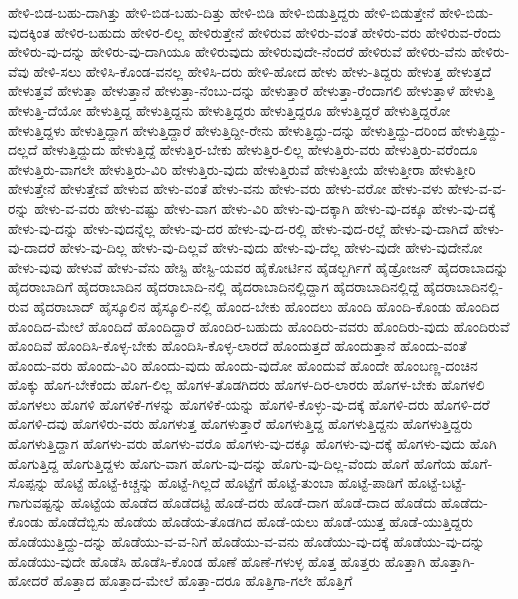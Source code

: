 {ಹೇಳಿ-ಬಿಡ-ಬಹು-ದಾಗಿತ್ತು
ಹೇಳಿ-ಬಿಡ-ಬಹು-ದಿತ್ತು
ಹೇಳಿ-ಬಿಡಿ
ಹೇಳಿ-ಬಿಡುತ್ತಿದ್ದರು
ಹೇಳಿ-ಬಿಡುತ್ತೇನೆ
ಹೇಳಿ-ಬಿಡು-ವುದಕ್ಕಿಂತ
ಹೇಳಿರ-ಬಹುದು
ಹೇಳಿರ-ಲಿಲ್ಲ
ಹೇಳಿರುತ್ತೇನೆ
ಹೇಳಿರುವ
ಹೇಳಿರು-ವಂತೆ
ಹೇಳಿರು-ವರು
ಹೇಳಿರುವ-ರೆಂದು
ಹೇಳಿರು-ವು-ದನ್ನು
ಹೇಳಿರು-ವು-ದಾಗಿಯೂ
ಹೇಳಿರುವುದು
ಹೇಳಿರುವುದೇ-ನೆಂದರೆ
ಹೇಳಿರುವೆ
ಹೇಳಿರು-ವೆನು
ಹೇಳಿರು-ವೆವು
ಹೇಳಿ-ಸಲು
ಹೇಳಿಸಿ-ಕೊಂಡ-ವನಲ್ಲ
ಹೇಳಿಸಿ-ದರು
ಹೇಳಿ-ಹೋದ
ಹೇಳು
ಹೇಳು-ತಿದ್ದರು
ಹೇಳುತ್ತ
ಹೇಳುತ್ತದೆ
ಹೇಳುತ್ತವೆ
ಹೇಳುತ್ತಾ
ಹೇಳುತ್ತಾನೆ
ಹೇಳುತ್ತಾ-ನೆಂಬು-ದನ್ನು
ಹೇಳುತ್ತಾರೆ
ಹೇಳುತ್ತಾ-ರೆಂದಾಗಲಿ
ಹೇಳುತ್ತಾಳೆ
ಹೇಳುತ್ತಿ
ಹೇಳುತ್ತಿ-ದೆಯೋ
ಹೇಳುತ್ತಿದ್ದ
ಹೇಳುತ್ತಿದ್ದನು
ಹೇಳುತ್ತಿದ್ದರು
ಹೇಳುತ್ತಿದ್ದರೂ
ಹೇಳುತ್ತಿದ್ದರೆ
ಹೇಳುತ್ತಿದ್ದರೋ
ಹೇಳುತ್ತಿದ್ದಳು
ಹೇಳುತ್ತಿದ್ದಾಗ
ಹೇಳುತ್ತಿದ್ದಾರೆ
ಹೇಳುತ್ತಿದ್ದೀ-ರೇನು
ಹೇಳುತ್ತಿದ್ದು-ದನ್ನು
ಹೇಳುತ್ತಿದ್ದು-ದರಿಂದ
ಹೇಳುತ್ತಿದ್ದು-ದಲ್ಲದೆ
ಹೇಳುತ್ತಿದ್ದುದು
ಹೇಳುತ್ತಿದ್ದೆ
ಹೇಳುತ್ತಿರ-ಬೇಕು
ಹೇಳುತ್ತಿರ-ಲಿಲ್ಲ
ಹೇಳುತ್ತಿರು-ವರು
ಹೇಳುತ್ತಿರು-ವರೆಂದೂ
ಹೇಳುತ್ತಿರು-ವಾಗಲೇ
ಹೇಳುತ್ತಿರು-ವಿರಿ
ಹೇಳುತ್ತಿರು-ವುದು
ಹೇಳುತ್ತಿರುವೆ
ಹೇಳುತ್ತೀಯೆ
ಹೇಳುತ್ತೀರಾ
ಹೇಳುತ್ತೀರಿ
ಹೇಳುತ್ತೇನೆ
ಹೇಳುತ್ತೇವೆ
ಹೇಳುವ
ಹೇಳು-ವಂತೆ
ಹೇಳು-ವನು
ಹೇಳು-ವರು
ಹೇಳು-ವರೋ
ಹೇಳು-ವಳು
ಹೇಳು-ವ-ವ-ರನ್ನು
ಹೇಳು-ವ-ವರು
ಹೇಳು-ವಷ್ಟು
ಹೇಳು-ವಾಗ
ಹೇಳು-ವಿರಿ
ಹೇಳು-ವು-ದಕ್ಕಾಗಿ
ಹೇಳು-ವು-ದಕ್ಕೂ
ಹೇಳು-ವು-ದಕ್ಕೆ
ಹೇಳು-ವು-ದನ್ನು
ಹೇಳು-ವುದನ್ನೆಲ್ಲ
ಹೇಳು-ವು-ದರ
ಹೇಳು-ವು-ದ-ರಲ್ಲಿ
ಹೇಳು-ವುದ-ರಲ್ಲೆ
ಹೇಳು-ವು-ದಾಗಿದೆ
ಹೇಳು-ವು-ದಾದರೆ
ಹೇಳು-ವು-ದಿಲ್ಲ
ಹೇಳು-ವು-ದಿಲ್ಲವೆ
ಹೇಳು-ವುದು
ಹೇಳು-ವು-ದೆಲ್ಲ
ಹೇಳು-ವುದೇ
ಹೇಳು-ವುದೇನೋ
ಹೇಳು-ವುವು
ಹೇಳುವೆ
ಹೇಳು-ವೆನು
ಹೇಸ್ಟಿ
ಹೇಸ್ಟಿ-ಯವರ
ಹೈಕೋರ್ಟಿನ
ಹೈಡಲ್ಬರ್ಗಿಗೆ
ಹೈಡ್ರೋಜನ್
ಹೈದರಾಬಾದನ್ನು
ಹೈದರಾಬಾದಿಗೆ
ಹೈದರಾಬಾದಿನ
ಹೈದರಾಬಾದಿ-ನಲ್ಲಿ
ಹೈದರಾಬಾದಿನಲ್ಲಿದ್ದಾಗ
ಹೈದರಾಬಾದಿನಲ್ಲಿದ್ದೆ
ಹೈದರಾಬಾದಿನಲ್ಲಿ-ರುವ
ಹೈದರಾಬಾದ್
ಹೈಸ್ಕೂಲಿನ
ಹೈಸ್ಕೂಲಿ-ನಲ್ಲಿ
ಹೊಂದ-ಬೇಕು
ಹೊಂದಲು
ಹೊಂದಿ
ಹೊಂದಿ-ಕೊಂಡು
ಹೊಂದಿದ
ಹೊಂದಿದ-ಮೇಲೆ
ಹೊಂದಿದೆ
ಹೊಂದಿದ್ದಾರೆ
ಹೊಂದಿರ-ಬಹುದು
ಹೊಂದಿರು-ವವರು
ಹೊಂದಿರು-ವುದು
ಹೊಂದಿರುವೆ
ಹೊಂದಿವೆ
ಹೊಂದಿಸಿ-ಕೊಳ್ಳ-ಬೇಕು
ಹೊಂದಿಸಿ-ಕೊಳ್ಳ-ಲಾರದೆ
ಹೊಂದುತ್ತದೆ
ಹೊಂದುತ್ತಾನೆ
ಹೊಂದು-ವಂತೆ
ಹೊಂದು-ವರು
ಹೊಂದು-ವಿರಿ
ಹೊಂದು-ವುದು
ಹೊಂದು-ವುದೋ
ಹೊಂದುವೆ
ಹೊಂದೇ
ಹೊಂಬಣ್ಣ-ದಂಚಿನ
ಹೊಕ್ಕು
ಹೊಗ-ಬೇಕೆಂದು
ಹೊಗ-ಲಿಲ್ಲ
ಹೊಗಳ-ತೊಡಗಿದರು
ಹೊಗಳ-ದಿರ-ಲಾರರು
ಹೊಗಳ-ಬೇಕು
ಹೊಗಳಲಿ
ಹೊಗಳಲು
ಹೊಗಳಿ
ಹೊಗಳಿಕೆ-ಗಳನ್ನು
ಹೊಗಳಿಕೆ-ಯನ್ನು
ಹೊಗಳಿ-ಕೊಳ್ಳು-ವು-ದಕ್ಕೆ
ಹೊಗಳಿ-ದರು
ಹೊಗಳಿ-ದರೆ
ಹೊಗಳಿ-ದವು
ಹೊಗಳಿರು-ವರು
ಹೊಗಳುತ್ತ
ಹೊಗಳುತ್ತಾರೆ
ಹೊಗಳುತ್ತಿದ್ದ
ಹೊಗಳುತ್ತಿದ್ದನು
ಹೊಗಳುತ್ತಿದ್ದರು
ಹೊಗಳುತ್ತಿದ್ದಾಗ
ಹೊಗಳು-ವರು
ಹೊಗಳು-ವರೊ
ಹೊಗಳು-ವು-ದಕ್ಕೂ
ಹೊಗಳು-ವು-ದಕ್ಕೆ
ಹೊಗಳು-ವುದು
ಹೊಗಿ
ಹೊಗುತ್ತಿದ್ದ
ಹೊಗುತ್ತಿದ್ದಳು
ಹೊಗು-ವಾಗ
ಹೊಗು-ವು-ದನ್ನು
ಹೊಗು-ವು-ದಿಲ್ಲ-ವೆಂದು
ಹೊಗೆ
ಹೊಗೆಯ
ಹೊಗೆ-ಸೊಪ್ಪನ್ನು
ಹೊಟ್ಟೆ
ಹೊಟ್ಟೆ-ಕಿಚ್ಚನ್ನು
ಹೊಟ್ಟೆ-ಗಿಲ್ಲದೆ
ಹೊಟ್ಟೆಗೆ
ಹೊಟ್ಟೆ-ತುಂಬಾ
ಹೊಟ್ಟೆ-ಪಾಡಿಗೆ
ಹೊಟ್ಟೆ-ಬಟ್ಟೆ-ಗಾಗುವಷ್ಟನ್ನು
ಹೊಟ್ಟೆಯ
ಹೊಡೆದ
ಹೊಡೆದಟ್ಟಿ
ಹೊಡೆ-ದರು
ಹೊಡೆ-ದಾಗ
ಹೊಡೆ-ದಾದ
ಹೊಡೆದು
ಹೊಡೆದು-ಕೊಂಡು
ಹೊಡೆದೆಬ್ಬಿಸು
ಹೊಡೆಯ
ಹೊಡೆಯ-ತೊಡಗಿದ
ಹೊಡೆ-ಯಲು
ಹೊಡೆ-ಯುತ್ತ
ಹೊಡೆ-ಯುತ್ತಿದ್ದರು
ಹೊಡೆಯುತ್ತಿದ್ದು-ದನ್ನು
ಹೊಡೆಯು-ವ-ವ-ನಿಗೆ
ಹೊಡೆಯು-ವ-ವನು
ಹೊಡೆಯು-ವು-ದಕ್ಕೆ
ಹೊಡೆಯು-ವು-ದನ್ನು
ಹೊಡೆಯು-ವುದೇ
ಹೊಡೆಸಿ
ಹೊಡೆಸಿ-ಕೊಂಡ
ಹೊಣೆ
ಹೊಣೆ-ಗಳುಳ್ಳ
ಹೊತ್ತ
ಹೊತ್ತರು
ಹೊತ್ತಾಗಿ
ಹೊತ್ತಾಗಿ-ಹೋದರೆ
ಹೊತ್ತಾದ
ಹೊತ್ತಾದ-ಮೇಲೆ
ಹೊತ್ತಾ-ದರೂ
ಹೊತ್ತಿಗಾ-ಗಲೇ
ಹೊತ್ತಿಗೆ
}
